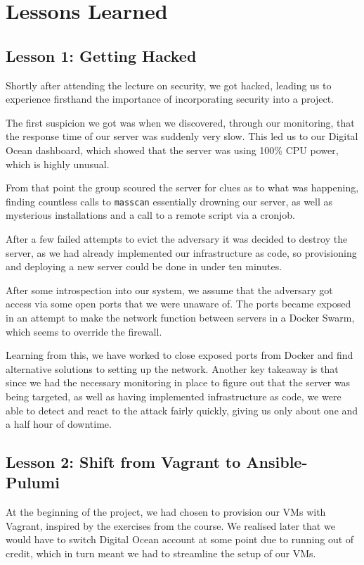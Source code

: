 \section{Lessons Learned}

\subsection{Lesson 1: Getting Hacked}
\label{section_hacked}
Shortly after attending the lecture on security, we got hacked, leading us to experience firsthand the importance of incorporating security into a project.

The first suspicion we got was when we discovered, through our monitoring, that the response time of our server was suddenly very slow. This led us to our Digital Ocean dashboard, which showed that the server was using 100\% CPU power, which is highly unusual.

From that point the group scoured the server for clues as to what was happening, finding countless calls to \texttt{masscan} essentially drowning our server, as well as mysterious installations and a call to a remote script via a cronjob.

After a few failed attempts to evict the adversary it was decided to destroy the server, as we had already implemented our infrastructure as code, so provisioning and deploying a new server could be done in under ten minutes.

After some introspection into our system, we assume that the adversary got access via some open ports that we were unaware of. The ports became exposed in an attempt to make the network function between servers in a Docker Swarm, which seems to override the firewall.

Learning from this, we have worked to close exposed ports from Docker and find alternative solutions to setting up the network. Another key takeaway is that since we had the necessary monitoring in place to figure out that the server was being targeted, as well as having implemented infrastructure as code, we were able to detect and react to the attack fairly quickly, giving us only about one and a half hour of downtime.

\subsection{Lesson 2: Shift from Vagrant to Ansible-Pulumi}
At the beginning of the project, we had chosen to provision our VMs with Vagrant, inspired by the exercises from the course.
We realised later that we would have to switch Digital Ocean account at some point due to running out of credit, which in turn meant we had to streamline the setup of our VMs.

